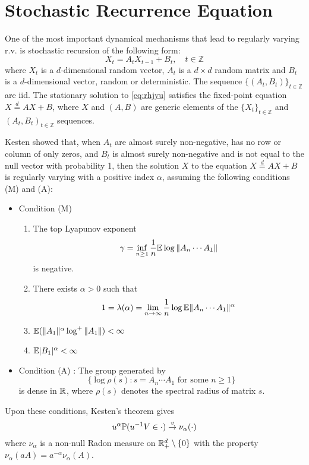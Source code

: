 \section{Stochastic Recurrence Equation}
One of the most important dynamical mechanisms that lead to regularly
varying r.v. is stochastic recursion of the following form:
\begin{equation}
  \label{eq:rhjyu}
  X_t = A_t X_{t-1} + B_t, \quad t \in \mathbb Z
\end{equation}
where $X_t$ is a $d$-dimensional random vector, $A_t$ is a $d\times d$
random matrix and $B_t$ is a $d$-dimensional vector, random or
deterministic. The sequence $\{(A_t, B_t)\}_{t \in \mathbb Z}$ are
iid. The stationary solution to \eqref{eq:rhjyu} satisfies the fixed-point
equation $X \overset{d}{=} A X + B$, where $X$ and $(A, B)$ are
generic elements of the $\{X_t\}_{t \in \mathbb Z}$ and
$(A_t, B_t)_{t \in \mathbb Z}$ sequences.

Kesten \cite{kesten:1973} showed that, when $A_t$ are almost
surely non-negative, has no row or column of only zeros, and
$B_t$ is almost surely non-negative and is not equal to the null
vector with probability 1, then the solution $X$ to the equation
$X \overset{d}{=} A X + B$ is regularly varying with a positive index
$\alpha$, assuming the following conditions (M) and (A):
\begin{itemize}
\item Condition (M)
  \begin{enumerate}
  \item The top Lyapunov exponent
    \[
    \gamma = \inf_{n \geq 1} {1 \over n}\mathbb{E} \log \|A_n \cdots A_1\|
    \]
    is negative.
  \item There exists $\alpha > 0$ such that
    \[
    1 = \lambda(\alpha) = \lim_{n \to \infty} {1 \over n} \log \mathbb{E} \|A_n \cdots A_1\|^\alpha
    \]
  \item $\mathbb{E} (\|A_1\|^\alpha \log^+\|A_1\|) < \infty$
  \item $\mathbb{E} |B_1|^\alpha < \infty$
  \end{enumerate}
\item Condition (A) : The group generated by
  \[
  \{\log\rho(s): s = A_n \cdots A_1 \text{ for some } n \geq 1\}
  \]
  is dense in $\mathbb R$, where $\rho(s)$ denotes the spectral
  radius of matrix $s$.
\end{itemize}
Upon these conditions, Kesten's theorem gives
\begin{equation}
  \label{eq:jorg}
  u^\alpha \P(u^{-1} V \in \cdot) \overset{v}{\to} \nu_\alpha(\cdot)
\end{equation}
where $\nu_\alpha$ is a non-null Radon measure on
$\mathbb R^d_+ \setminus \{0\}$ with the property
$\nu_\alpha(a A) = a^{-\alpha} \nu_\alpha(A)$.

